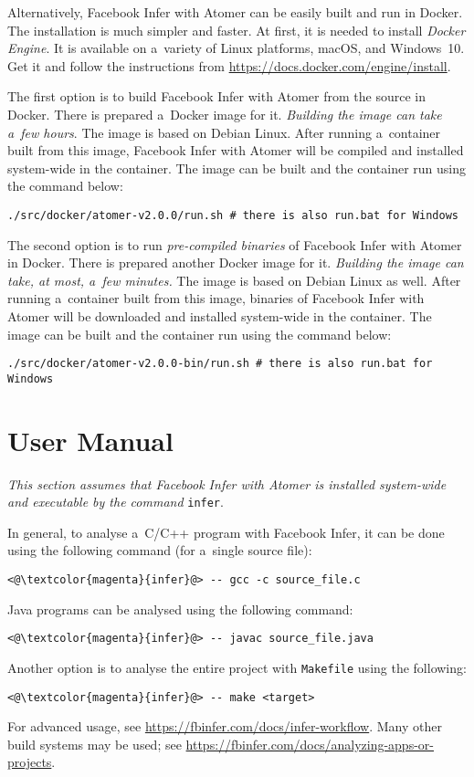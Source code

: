 Alternatively, Facebook Infer with Atomer can be easily built and run in Docker. The installation is much simpler and faster. At first, it is needed to install \emph{Docker Engine}. It is available on a~variety of Linux platforms, macOS, and Windows~10. Get it and follow the instructions from \url{https://docs.docker.com/engine/install}.

The first option is to build Facebook Infer with Atomer from the source in Docker. There is prepared a~Docker image for it. \textit{Building the image can take a~few hours}. The image is based on Debian Linux. After running a~container built from this image, Facebook Infer with Atomer will be compiled and installed system-wide in the container. The image can be built and the container run using the command below:
\begin{lstlisting}[style=bash]
./src/docker/atomer-v2.0.0/run.sh # there is also run.bat for Windows
\end{lstlisting}

The second option is to run \emph{pre-compiled binaries} of Facebook Infer with Atomer in Docker. There is prepared another Docker image for it. \textit{Building the image can take, at most, a~few minutes.} The image is based on Debian Linux as well. After running a~container built from this image, binaries of Facebook Infer with Atomer will be downloaded and installed system-wide in the container. The image can be built and the container run using the command below:
\begin{lstlisting}[style=bash]
./src/docker/atomer-v2.0.0-bin/run.sh # there is also run.bat for Windows
\end{lstlisting}


\section*{User Manual}

\textit{This section assumes that Facebook Infer with Atomer is installed system-wide and executable by the command} \texttt{infer}.

In general, to analyse a~C/C++ program with Facebook Infer, it can be done using the following command (for a~single source file):
\begin{lstlisting}[style=bash]
<@\textcolor{magenta}{infer}@> -- gcc -c source_file.c
\end{lstlisting}
Java programs can be analysed using the following command:
\begin{lstlisting}[style=bash]
<@\textcolor{magenta}{infer}@> -- javac source_file.java
\end{lstlisting}
Another option is to analyse the entire project with \texttt{Makefile} using the following:
\begin{lstlisting}[style=bash]
<@\textcolor{magenta}{infer}@> -- make <target>
\end{lstlisting}
For advanced usage, see \url{https://fbinfer.com/docs/infer-workflow}. Many other build systems may be used; see \url{https://fbinfer.com/docs/analyzing-apps-or-projects}.

